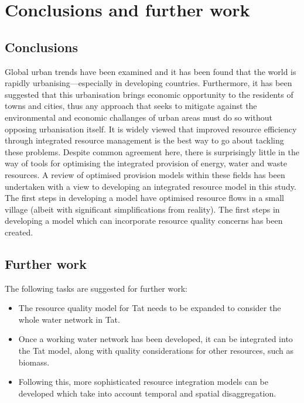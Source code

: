\section{Conclusions and further work}
\label{sec:conc}

\subsection{Conclusions}
Global urban trends have been examined and it has been found that the world is rapidly urbanising---especially in developing countries. Furthermore, it has been suggested that this urbanisation brings economic opportunity to the residents of towns and cities, thus any approach that seeks to mitigate against the environmental and economic challanges of urban areas must do so without opposing urbanisation itself. It is widely viewed that improved resource efficiency through integrated resource management is the best way to go about tackling these problems. Despite common agreement here, there is surprisingly little in the way of tools for optimising the integrated provision of energy, water and waste resources. A review of optimised provision models within these fields has been undertaken with a view to developing an integrated resource model in this study. The first steps in developing a model have optimised resource flows in a small village (albeit with significant simplifications from reality). The first steps in developing a model which can incorporate resource quality concerns has been created.

\subsection{Further work}
The following tasks are suggested for further work:
\begin{itemize}
	\item The resource quality model for Tat needs to be expanded to consider the whole water network in Tat.
	\item Once a working water network has been developed, it can be integrated into the Tat model, along with quality considerations for other resources, such as biomass. 
	\item Following this, more sophisticated resource integration models can be developed which take into account temporal and spatial disaggregation.
\end{itemize}

